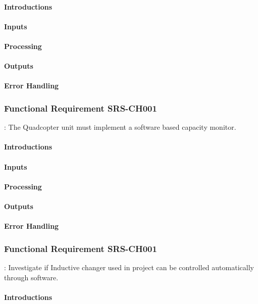 \documentclass[a4paper]{article}
\begin{document}
\paragraph{Introductions}
\paragraph{Inputs}
\paragraph{Processing}
\paragraph{Outputs}
\paragraph{Error Handling}

\subsubsection{Functional Requirement SRS-CH001}
: The Quadcopter unit must implement a software based capacity monitor.
\paragraph{Introductions}
\paragraph{Inputs}
\paragraph{Processing}
\paragraph{Outputs}
\paragraph{Error Handling}

\subsubsection{Functional Requirement SRS-CH001}
: Investigate if Inductive changer used in project can be controlled automatically  through software.
\paragraph{Introductions}
\end{document}

